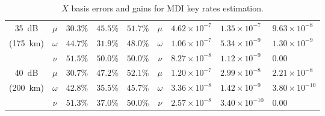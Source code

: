 \begin{table}[p]
\begin{tabular}{cclllclll}
        \SI{35}{dB}  & $\mu$        & $30.3\%$                  & $45.5\%$                  & $51.7\%                 $ & $\mu$        & $4.62\times10^{-7}$     & $1.35\times10^{-7}$     & $9.63\times10^{-8}$     \\
(\SI{175}{\km}) & $\omega$        & $44.7\%$                  & $31.9\%$                  & $48.0\%$                  & $\omega$        & $1.06\times10^{-7}$     & $5.34\times10^{-9}$     & $1.30\times10^{-9}$\\
        & $\nu$        & $51.5\%$                  & $50.0\%$                  & $50.0\%$                  & $\nu$        & $8.27\times10^{-8}$     & $1.12\times10^{-9}$     & $0.00$     \vspace{5pt}\\
\SI{40}{dB} & $\mu$        & $30.7\%$                  & $47.2\%$                  & $52.1\%$                  & $\mu$        & $1.20\times10^{-7}$     & $2.99\times10^{-8}$     & $2.21\times10^{-8}$     \\
(\SI{200}{\km}) & $\omega$        & $42.8\%$                  & $35.5\%$                  & $45.7\%$                  & $\omega$        & $3.36\times10^{-8}$     & $1.42\times10^{-9}$     & $3.80\times10^{-10}$    \\
        & $\nu$        & $51.3\%$                  & $37.0\%$                  & $50.0\%$                  & $\nu$        & $2.57\times10^{-8}$     & $3.40\times10^{-10}$    & $0.00$                 
\end{tabular}
\caption{$X$ basis errors and gains for \acs{MDI} key rates estimation.}
\end{table}


